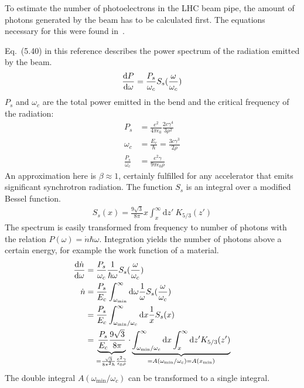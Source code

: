 
To estimate the number of photoelectrons in the LHC beam pipe, the amount of photons generated by the beam has to be calculated first.
The equations necessary for this were found in~\cite{hofmann}.

Eq.~(5.40) in this reference describes the power spectrum of the radiation emitted by the beam.
\begin{align}
    \frac{\text{d}P}{\text{d}\omega} = \frac{P_s}{\omega_c} S_s(\frac{\omega}{\omega_c})
    \label{eq:dp}
\end{align}
$P_s$ and $\omega_c$ are the total power emitted in the bend and the critical frequency of the radiation:
\begin{align}
    P_s &= \frac{e^2}{4\pi\epsilon_0}\frac{2c\gamma^4}{3\rho^2}
    \label{eq:ps}
    \\
    \omega_c &= \frac{E_c}{\hbar} = \frac{3c\gamma^3}{2\rho}
    \label{eq:omega_c}
    \\
    \frac{P_s}{\omega_c} &= \frac{e^2\gamma}{9\pi\epsilon_0\rho}
\end{align}
An approximation here is $\beta\approx1$, certainly fulfilled for any accelerator that emits significant synchrotron radiation.
The function $S_s$ is an integral over a modified Bessel function.
\begin{align}
    S_s(x) = \frac{9\sqrt{3}}{8\pi} x \int_x^\infty \text{d}z'\ K_{5/3}(z')
    \label{eq:s_s}
\end{align}
The spectrum is easily transformed from frequency to number of photons with the relation $P(\omega)=\dot{n}\hbar\omega$.
Integration yields the number of photons above a certain energy, for example the work function of a material.
\begin{align}
    \frac{\text{d}\dot{n}}{\text{d}\omega} &= \frac{P_s}{\omega_c} \frac{1}{\hbar\omega}S_s(\frac{\omega}{\omega_c})
    \label{eq:nomega}
    \\
    \dot{n} &= \frac{P_s}{E_c}\int_{\omega_\text{min}}^\infty \text{d}\omega \frac{1}{\omega} S_s(\frac{\omega}{\omega_c})
    \\
    &= \frac{P_s}{E_c}\int_{\omega_\text{min}/\omega_c}^\infty \text{d}x \frac{1}{x} S_s(x)
    \\
    &= \underbrace{\frac{P_s}{E_c}  \frac{9\sqrt{3}}{8\pi}}_{=\frac{\sqrt{3}}{8\pi^2\hbar}\frac{e^2\gamma}{\epsilon_0\rho}}
    \cdot
    \underbrace{\int_{\omega_\text{min}/\omega_c}^\infty \text{d}x  \int_x^\infty \text{d}z' K_{5/3}(z')}_{=A(\omega_\text{min}/\omega_c) = A(x_\text{min})}
\end{align}
The double integral $A(\omega_\text{min}/\omega_c)$ can be transformed to a single integral.
